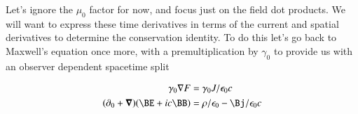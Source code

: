 \documentclass{article}
\begin{document}
Let's ignore the $\mu_0$ factor for now, and focus just on the field dot products.  We will want to express these time derivatives in
terms of the current and spatial derivatives to determine the conservation identity.  To do this let's go back to Maxwell's equation
once more, with a premultiplication by $\gamma_0$ to provide us with an observer dependent spacetime split

\begin{align*}
\gamma_0 \grad F &= \gamma_0 J / \epsilon_0 c \\
(\partial_0 + \spacegrad) ( \BE + i c \BB ) &= \rho/\epsilon_0 - \Bj/\epsilon_0 c \\
\end{align*}






%

%
%
%
%



\end{document}
